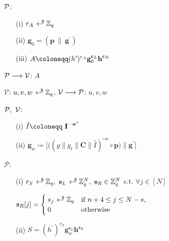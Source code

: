 \begin{mdframed}
\begin{itemize}[itemsep=4pt]
    \vspace{-4pt}
    \item[] $\P$:\vspace{-4pt}
    \begin{enumerate}[itemsep=5pt]
        \item[(i)] $r_A \rgen \Z_q$
        
        \item[(ii)] $\textbf{g}_{0} = ( \textbf{p} \ \| \ \textbf{g}^{\prime} )$
        
        \item[(iii)] $A \coloneqq (h^{\prime})^{r_A} \textbf{g}_0^{\cL} \textbf{h}^{\cR}$ 
        
    \end{enumerate}
  
    \item[] $\mathcal{P} \longrightarrow \V$: $A$

    \item[] $\mathcal{V}$: $u, v, w \rgen \Z_q$, $\mathcal{V} \longrightarrow \P$: $u, v, w$


    \item[] $\P, \ \V$:
    \begin{enumerate}[itemsep=5pt]
        \item[(i)] $\hat{I} \coloneqq \ \textbf{I}^{- \vecnb{u}^s}$
        
        \item[(ii)] $\textbf{g}_{w} \coloneqq \big[ \big((g \| g_t \| \textbf{C} \| \hat{I})^{\circ w} \circ \textbf{p}\big) \|\textbf{g}^{\prime} \big]$
    \end{enumerate}
      
    \item[] $\mathcal{P}$:
    \begin{enumerate}[itemsep=5pt]
        \item[(i)] $r_S \rgen \Z_q, \ \textbf{s}_L \rgen \Z_q^N, \ \textbf{s}_R \in \Z_q^N$ s.t. $\forall j \in [N]$ 
        \vspace{-3mm}
        \item[] $\textbf{s}_R[j] = 
        \begin{cases}
          s_j \rgen \Z_q & \text{if } n+4 \le j \le N-s ,\\
          0 & \text{otherwise}
        \end{cases}$ 
        \item[(ii)] $S = (h^{\prime})^{r_S} \textbf{g}_w^{\textbf{s}_L} \textbf{h}^{\textbf{s}_R}$ 
    \end{enumerate}
    

\end{itemize}
\end{mdframed}
